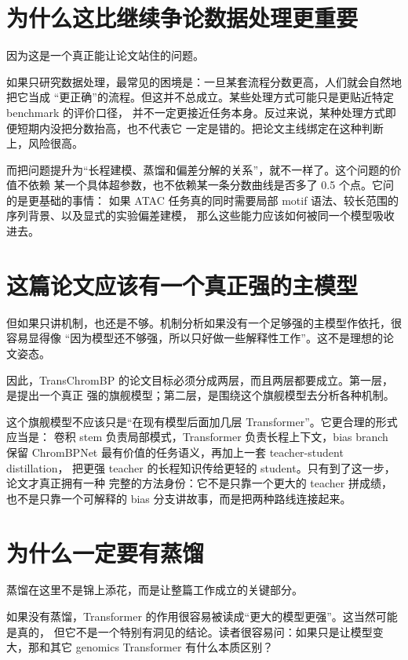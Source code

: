 \documentclass[11pt,a4paper]{ctexart}
\begin{document}
\section*{为什么这比继续争论数据处理更重要}

因为这是一个真正能让论文站住的问题。

如果只研究数据处理，最常见的困境是：一旦某套流程分数更高，人们就会自然地把它当成
“更正确”的流程。但这并不总成立。某些处理方式可能只是更贴近特定 benchmark 的评价口径，
并不一定更接近任务本身。反过来说，某种处理方式即便短期内没把分数抬高，也不代表它
一定是错的。把论文主线绑定在这种判断上，风险很高。

而把问题提升为“长程建模、蒸馏和偏差分解的关系”，就不一样了。这个问题的价值不依赖
某一个具体超参数，也不依赖某一条分数曲线是否多了 0.5 个点。它问的是更基础的事情：
如果 ATAC 任务真的同时需要局部 motif 语法、较长范围的序列背景、以及显式的实验偏差建模，
那么这些能力应该如何被同一个模型吸收进去。

\section*{这篇论文应该有一个真正强的主模型}

但如果只讲机制，也还是不够。机制分析如果没有一个足够强的主模型作依托，很容易显得像
“因为模型还不够强，所以只好做一些解释性工作”。这不是理想的论文姿态。

因此，TransChromBP 的论文目标必须分成两层，而且两层都要成立。第一层，是提出一个真正
强的旗舰模型；第二层，是围绕这个旗舰模型去分析各种机制。

这个旗舰模型不应该只是“在现有模型后面加几层 Transformer”。它更合理的形式应当是：
卷积 stem 负责局部模式，Transformer 负责长程上下文，bias branch 保留
ChromBPNet 最有价值的任务语义，再加上一套 teacher-student distillation，
把更强 teacher 的长程知识传给更轻的 student。只有到了这一步，论文才真正拥有一种
完整的方法身份：它不是只靠一个更大的 teacher 拼成绩，也不是只靠一个可解释的 bias
分支讲故事，而是把两种路线连接起来。

\section*{为什么一定要有蒸馏}

蒸馏在这里不是锦上添花，而是让整篇工作成立的关键部分。

如果没有蒸馏，Transformer 的作用很容易被读成“更大的模型更强”。这当然可能是真的，
但它不是一个特别有洞见的结论。读者很容易问：如果只是让模型变大，那和其它 genomics
Transformer 有什么本质区别？
\end{document}
